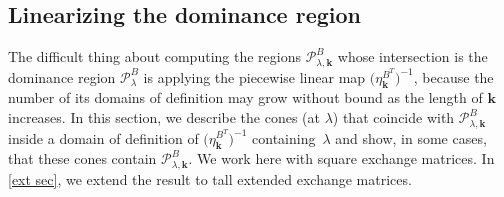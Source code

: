 \documentclass{amsart}
\theoremstyle{definition}
\theoremstyle{remark}
\numberwithin{equation}{section}
\newcommand{\0}{{\mathbf{0}}}
\newcommand{\g}{\mathbf{g}}
\newcommand{\kk}{\mathbf{k}}
\renewcommand{\P}{\mathcal{P}}
\begin{document}
\subsection{Linearizing the dominance region}\label{lin sec}
The difficult thing about computing the regions $\P^B_{\lambda,\kk}$ whose intersection is the dominance region $\P^B_\lambda$ is applying the piecewise linear map $\bigl(\eta^{B^T}_\kk\bigr)^{-1}$, because the number of its domains of definition may grow without bound as the length of $\kk$ increases.
In this section, we describe the cones (at $\lambda$) that coincide with $\P^B_{\lambda,\kk}$ inside a domain of definition of $\bigl(\eta^{B^T}_\kk\bigr)^{-1}$ containing~$\lambda$ and show, in some cases, that these cones contain $\P^B_{\lambda,\kk}$.
We work here with square exchange matrices.
In \cref{ext sec}, we extend the result to tall extended exchange matrices.
\end{document}
